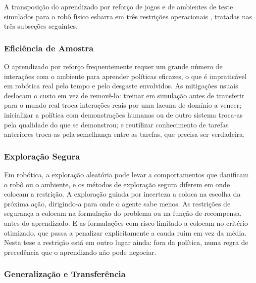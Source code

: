 A transposição do aprendizado por reforço de jogos e de ambientes de teste simulados para o robô físico esbarra em três restrições operacionais \cite{Kober2013, Arulkumaran2017DeepRL}, tratadas nas três subseções seguintes.

\subsubsection{Eficiência de Amostra}

O aprendizado por reforço frequentemente requer um grande número de interações com o
ambiente para aprender políticas eficazes, o que é impraticável em robótica real pelo
tempo e pelo desgaste envolvidos. As mitigações usuais deslocam o custo em vez de
removê-lo: treinar em simulação antes de transferir para o mundo real troca interações
reais por uma lacuna de domínio a vencer; inicializar a política com demonstrações
humanas ou de outro sistema troca-as pela qualidade do que se demonstrou; e reutilizar
conhecimento de tarefas anteriores troca-as pela semelhança entre as tarefas, que precisa
ser verdadeira.

\subsubsection{Exploração Segura}

Em robótica, a exploração aleatória pode levar a comportamentos que danificam o robô ou o
ambiente, e os métodos de exploração segura diferem em onde colocam a restrição. A
exploração guiada por incerteza a coloca na escolha da próxima ação, dirigindo-a para
onde o agente sabe menos. As restrições de segurança a colocam na formulação do problema
ou na função de recompensa, antes do aprendizado. E as formulações com risco limitado a
colocam no critério otimizado, que passa a penalizar explicitamente a cauda ruim em vez
da média. Nesta tese a restrição está em outro lugar ainda: fora da política, numa regra
de precedência que o aprendizado não pode negociar.

\subsubsection{Generalização e Transferência}

